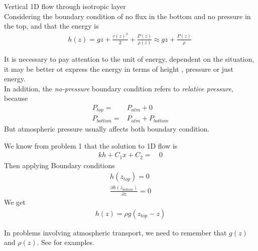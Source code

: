 \documentclass[a4paper, 11pt,article,oneside]{memoir}%
\begin{document}
\begin{exbox}{}{Vertical 1D flow through isotropic layer}\\
Considering the boundary condition of no flux in the bottom and no pressure in the top, and that the energy is 
\begin{align*}
h(z)=gz+\frac{v(z)^2}{2}+\frac{P(z)}{\rho(z)}\approx gz+\frac{P(z)}{\rho}\
\end{align*}
\begin{note}
It is necessary to pay attention to the unit of energy, dependent on the situation, it may be better ot express the energy in terms of height , pressure or just energy.\\
In addition, the \textit{no-pressure} boundary condition  refers to \textit{relative pressure}, because
\begin{align*}
P_{top}=&P_{atm}+0\\
P_{bottom}=&P_{atm}+P_{bottom}
\end{align*}
But atmospheric pressure usually affects both boundary condition. 	
\end{note}
We know from problem 1 that the solution to 1D flow  is 
\begin{align*}
kh+C_1x+C_2=& \,0
\end{align*}
Then applying Boundary conditions
\begin{align*}
h(z_{top})=0\\
\frac{\partial h(z_{bottom})}{\partial z}=0
\end{align*}
We get 
\begin{align*}
h(z)=\rho g (z_{top}-z)
\end{align*}
\begin{note}
In problems involving atmospheric transport, we need to remember that $g(z)$ and $\rho (z)$. See \cite{ICH2304} for examples.
\end{note}
\end{exbox}
\end{document}

